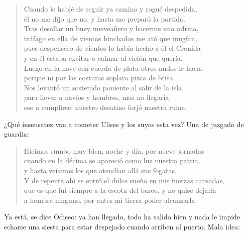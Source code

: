 \documentclass[11pt,a4paper]{article}
\begin{document}
\begin{verse}
Cuando le hablé de seguir ya camino y rogué despedida,\\
él no me dijo que no, y hasta me preparó la partida.\\
Tras desollar un buey nueveañero y hacerme una odrina,\\
tráfago en ella de vientos hinchados me ató que mugían,\\
pues despensero de vientos lo había hecho a él el Cronida\\
y en él estaba excitar o calmar al ciclón que quería.\\
Luego en la nave con cuerda de plata otros nudos le hacía\\
porque ni por las costuras soplara pizca de brisa.\\
Nos levantó un sostenido poniente al salir de la isla\\
para llevar a navíos y hombres, mas no llegaría\\
eso a cumplirse: nuestro desatino forjó nuestra ruina.
\end{verse}

¿Qué insensatez van a cometer Ulises y los suyos esta vez? Una de juzgado de guardia:

\begin{verse}
Hicimos rumbo muy bien, noche y día, por nueve jornadas\\
cuando en la décima se apareció como luz nuestra patria,\\
y hasta veíamos los que atendían allá sus fogatas.\\
Y de repente ahí se entró el dulce sueño en mis fuerzas cansadas,\\
que es que fui siempre a la escota del barco, y no quise dejarla\\
a hombre ninguno, por antes mi tierra poder alcanzarla.
\end{verse}

Ya está, se dice Odiseo: ya han llegado, todo ha salido bien y nada le impide echarse una siesta para estar despejado cuando arriben al puerto. Mala idea:
\end{document}
